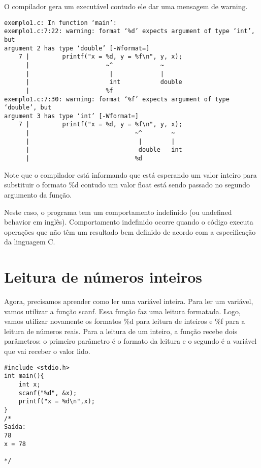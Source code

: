 \documentclass[a4paper,11pt]{article}
\begin{document}
O compilador gera um executável contudo ele dar uma mensagem de warning.

\begin{verbatim}
exemplo1.c: In function ‘main’:
exemplo1.c:7:22: warning: format ‘%d’ expects argument of type ‘int’, but 
argument 2 has type ‘double’ [-Wformat=]
    7 |         printf("x = %d, y = %f\n", y, x);
      |                     ~^             ~
      |                      |             |
      |                      int           double
      |                     %f
exemplo1.c:7:30: warning: format ‘%f’ expects argument of type ‘double’, but 
argument 3 has type ‘int’ [-Wformat=]
    7 |         printf("x = %d, y = %f\n", y, x);
      |                             ~^        ~
      |                              |        |
      |                              double   int
      |                             %d
\end{verbatim}

Note que o compilador está informando que está esperando um valor inteiro para substituir o formato \%d contudo um valor float está sendo passado no segundo argumento da função.

Neste caso, o programa tem um comportamento indefinido (ou undefined behavior em inglês). Comportamento indefinido ocorre quando o código executa operações que não têm um resultado bem definido de acordo com a especificação da linguagem C.

\section*{Leitura de números inteiros}

Agora, precisamos aprender como ler uma variável inteira. Para ler um variável, vamos utilizar a função scanf. Essa função faz uma leitura formatada. Logo, vamos utilizar novamente os formatos \%d para leitura de inteiros e \%f para a leitura de números reais. Para a leitura de um inteiro, a função recebe dois parâmetros: o primeiro parâmetro é o formato da leitura e o segundo é a variável que vai receber o valor lido.

\begin{verbatim}
#include <stdio.h>
int main(){
	int x;
	scanf("%d", &x);
	printf("x = %d\n",x);	 
}
/*
Saída:
78
x = 78

*/
\end{verbatim}
\end{document}
